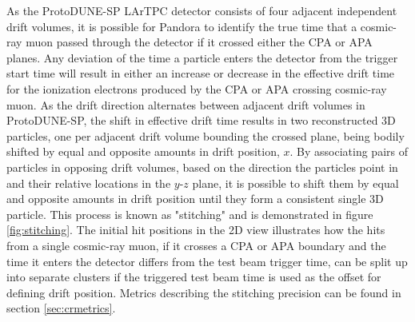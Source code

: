 As the ProtoDUNE-SP LArTPC detector consists of four adjacent independent drift volumes, it is possible for Pandora to identify the true time that a cosmic-ray muon passed through the detector if it crossed either the CPA or APA planes.  Any deviation of the time a particle enters the detector from the trigger start time will result in either an increase or decrease in the effective drift time for the ionization electrons produced by the CPA or APA crossing cosmic-ray muon.  As the drift direction alternates between adjacent drift volumes in ProtoDUNE-SP, the shift in effective drift time results in two reconstructed 3D particles, one per adjacent drift volume bounding the crossed plane, being bodily shifted by equal and opposite amounts in drift position, $x$.  By associating pairs of particles in opposing drift volumes, based on the direction the particles point in and their relative locations in the $y$-$z$ plane, it is possible to shift them by equal and opposite amounts in drift position until they form a consistent single 3D particle.  This process is known as "stitching" and is demonstrated in figure \ref{fig:stitching}.  The initial hit positions in the 2D view illustrates how the hits from a single cosmic-ray muon, if it crosses a CPA or APA boundary and the time it enters the detector differs from the test beam trigger time, can be split up into separate clusters if the triggered test beam time is used as the offset for defining drift position.  Metrics describing the stitching precision can be found in section \ref{sec:crmetrics}.

